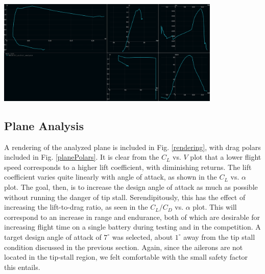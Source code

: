 \documentclass[]{auvsi_doc}
\begin{document}
\begin{center}
	\includegraphics[width=0.80\textwidth]{./figs/Polars20190116.png}
	\label{airfoilPolars}
\end{center}

\subsection{Plane Analysis}

A rendering of the analyzed plane is included in Fig. \ref{rendering}, with drag polars included in Fig. \ref{planePolars}. It is clear from the $C_L$ vs. $V$ plot that a lower flight speed corresponds to a higher lift coefficient, with diminishing returns. The lift coefficient varies quite linearly with angle of attack, as shown in the $C_L$ vs. $\alpha$ plot. The goal, then, is to increase the design angle of attack as much as possible without running the danger of tip stall. Serendipitously, this has the effect of increasing the lift-to-drag ratio, as seen in the $C_L/C_D$ vs. $\alpha$ plot. This will correspond to an increase in range and endurance, both of which are desirable for increasing flight time on a single battery during testing and in the competition. A target design angle of attack of $7^\circ$ was selected, about $1^\circ$ away from the tip stall condition discussed in the previous section. Again, since the ailerons are not located in the tip-stall region, we felt comfortable with the small safety factor this entails.
\end{document}
